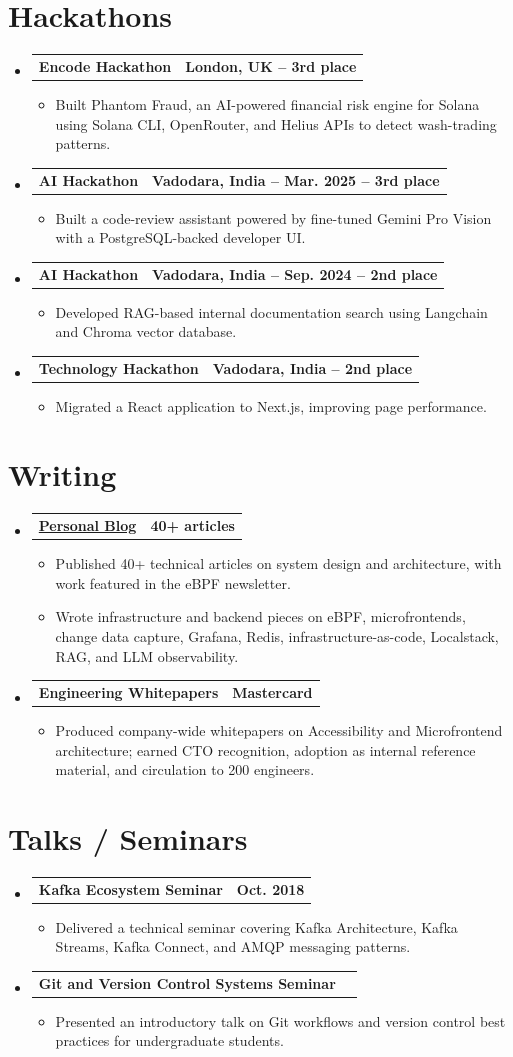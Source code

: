 \documentclass[letterpaper,11pt]{article}
\makeatletter
\newcommand{\resumeItem}[1]{
  \item\small{
    {#1 \vspace{-3pt}}
  }
}
\newcommand{\resumeProjectHeading}[2]{
  \vspace{-3pt}\item
    \begin{tabular*}{1.0\textwidth}[t]{l@{\extracolsep{\fill}}r}
      \textbf{#1} & \textbf{\small #2} \\
    \end{tabular*}\vspace{-7pt}
}
\newcommand{\resumeSubHeadingListStart}{\begin{itemize}[leftmargin=0.0in, label={}]}
\newcommand{\resumeSubHeadingListEnd}{\end{itemize}}
\newcommand{\resumeItemListStart}{\begin{itemize}}
\newcommand{\resumeItemListEnd}{\end{itemize}\vspace{0pt}}
\makeatother
\begin{document}
\section{Hackathons}
\resumeSubHeadingListStart
    \resumeProjectHeading
      {Encode Hackathon}{London, UK -- 3rd place}
      \resumeItemListStart
        \resumeItem{Built Phantom Fraud, an AI-powered financial risk engine for Solana using Solana CLI, OpenRouter, and Helius APIs to detect wash-trading patterns.}
      \resumeItemListEnd
    \resumeProjectHeading
      {AI Hackathon}{Vadodara, India -- Mar. 2025 -- 3rd place}
      \resumeItemListStart
        \resumeItem{Built a code-review assistant powered by fine-tuned Gemini Pro Vision with a PostgreSQL-backed developer UI.}
      \resumeItemListEnd
    \resumeProjectHeading
      {AI Hackathon}{Vadodara, India -- Sep. 2024 -- 2nd place}
      \resumeItemListStart
        \resumeItem{Developed RAG-based internal documentation search using Langchain and Chroma vector database.}
      \resumeItemListEnd
    \resumeProjectHeading
      {Technology Hackathon}{Vadodara, India -- 2nd place}
      \resumeItemListStart
        \resumeItem{Migrated a React application to Next.js, improving page performance.}
      \resumeItemListEnd
\resumeSubHeadingListEnd

\section{Writing}
\resumeSubHeadingListStart
    \resumeProjectHeading
      {\href{https://aymanace2049.hashnode.dev}{Personal Blog}}{40+ articles}
      \resumeItemListStart
        \resumeItem{Published 40+ technical articles on system design and architecture, with work featured in the eBPF newsletter.}
        \resumeItem{Wrote infrastructure and backend pieces on eBPF, microfrontends, change data capture, Grafana, Redis, infrastructure-as-code, Localstack, RAG, and LLM observability.}
      \resumeItemListEnd
    \resumeProjectHeading
      {Engineering Whitepapers}{Mastercard}
      \resumeItemListStart
        \resumeItem{Produced company-wide whitepapers on Accessibility and Microfrontend architecture; earned CTO recognition, adoption as internal reference material, and circulation to 200 engineers.}
      \resumeItemListEnd
\resumeSubHeadingListEnd

\section{Talks / Seminars}
\resumeSubHeadingListStart
    \resumeProjectHeading
      {Kafka Ecosystem Seminar}{Oct. 2018}
      \resumeItemListStart
        \resumeItem{Delivered a technical seminar covering Kafka Architecture, Kafka Streams, Kafka Connect, and AMQP messaging patterns.}
      \resumeItemListEnd
    \resumeProjectHeading
      {Git and Version Control Systems Seminar}{}
      \resumeItemListStart
        \resumeItem{Presented an introductory talk on Git workflows and version control best practices for undergraduate students.}
      \resumeItemListEnd
\resumeSubHeadingListEnd
\end{document}

